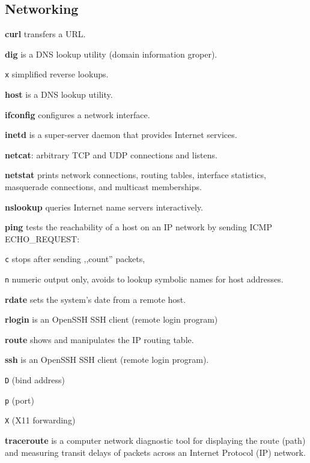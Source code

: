 \subsection{Networking}
\textbf{curl} transfers a URL.

\textbf{dig} is a DNS lookup utility (domain information groper).
\begin{enumx}
	\item [\texttt{x}] simplified reverse lookups.
\end{enumx}

\textbf{host} is a DNS lookup utility.

\textbf{ifconfig} configures a network interface.

\textbf{inetd} is a super-server daemon that provides Internet services.

\textbf{netcat}: arbitrary TCP and UDP connections and listens.

\textbf{netstat} prints network connections, routing tables, 
interface statistics, masquerade connections, and multicast memberships.

\textbf{nslookup} queries Internet name servers interactively.

\manualbreak

\textbf{ping} tests the reachability of a host 
on an IP network by sending ICMP ECHO\_REQUEST:
\begin{enumx}
	\item [\texttt{c}] stops after sending ,,count'' packets,
	\item [\texttt{n}] numeric output only, 
	avoids to lookup symbolic names for host addresses. 
\end{enumx}

\textbf{rdate} sets the system's date from a remote host.

\textbf{rlogin} is an OpenSSH SSH client (remote login program)

\textbf{route} shows and manipulates the IP routing table.

\textbf{ssh} is an OpenSSH SSH client (remote login program).
\begin{enumx}
	\item [\texttt{D}] (bind address)
	\item [\texttt{p}] (port)
	\item [\texttt{X}] (X11 forwarding)
\end{enumx}

\textbf{traceroute} is a computer network diagnostic tool for 
displaying the route (path) and measuring transit delays of 
packets across an Internet Protocol (IP) network.

